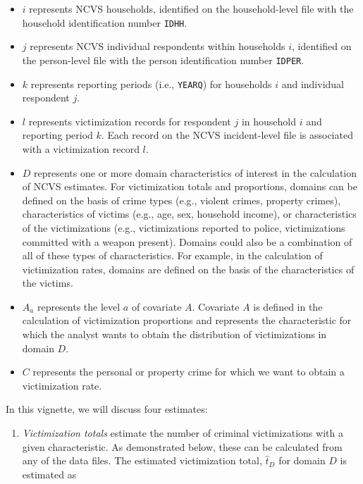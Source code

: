 \documentclass[
]{krantz}
\providecommand{\tightlist}{%
  \setlength{\itemsep}{0pt}\setlength{\parskip}{0pt}}
\begin{document}
\begin{itemize}
\tightlist
\item
  \(i\) represents NCVS households, identified on the household-level file with the household identification number \texttt{IDHH}.
\item
  \(j\) represents NCVS individual respondents within households \(i\), identified on the person-level file with the person identification number \texttt{IDPER}.
\item
  \(k\) represents reporting periods (i.e., \texttt{YEARQ}) for households \(i\) and individual respondent \(j\).
\item
  \(l\) represents victimization records for respondent \(j\) in household \(i\) and reporting period \(k\). Each record on the NCVS incident-level file is associated with a victimization record \(l\).
\item
  \(D\) represents one or more domain characteristics of interest in the calculation of NCVS estimates. For victimization totals and proportions, domains can be defined on the basis of crime types (e.g., violent crimes, property crimes), characteristics of victims (e.g., age, sex, household income), or characteristics of the victimizations (e.g., victimizations reported to police, victimizations committed with a weapon present). Domains could also be a combination of all of these types of characteristics. For example, in the calculation of victimization rates, domains are defined on the basis of the characteristics of the victims.
\item
  \(A_a\) represents the level \(a\) of covariate \(A\). Covariate \(A\) is defined in the calculation of victimization proportions and represents the characteristic for which the analyst wants to obtain the distribution of victimizations in domain \(D\).
\item
  \(C\) represents the personal or property crime for which we want to obtain a victimization rate.
\end{itemize}

In this vignette, we will discuss four estimates:

\begin{enumerate}
\def\labelenumi{\arabic{enumi}.}
\tightlist
\item
  \emph{Victimization totals} estimate the number of criminal victimizations with a given characteristic. As demonstrated below, these can be calculated from any of the data files. The estimated victimization total, \(\hat{t}_D\) for domain \(D\) is estimated as
\end{enumerate}
\end{document}

